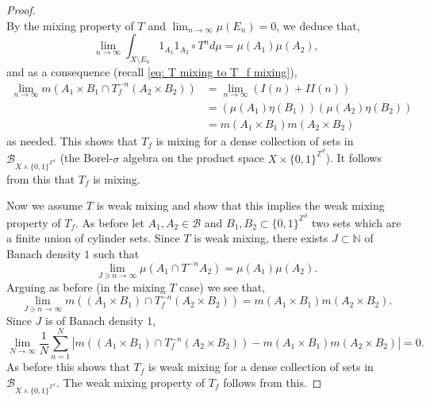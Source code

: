 \documentclass[12pt,reqno]{amsart}
\newcommand{\N}{\mathbb{N}}
\newcommand{\Z}{\mathbb{Z}}
\newcommand{\B}{\mathcal{B}}
\theoremstyle{definition}
\begin{document}
\begin{proof}
\[\]
By the mixing property of $T$ and $\lim_{n\to\infty}\mu\left(E_n\right)=0$, we deduce that,
\[
\lim_{n\to \infty}\int_{X\setminus E_n} 1_{A_1}1_{A_2}\circ T^n d\mu=\mu\left(A_1\right)\mu\left(A_2\right),
\]
and as a consequence (recall \eqref{eq: T mixing to T_f mixing}),
\begin{align*}
\lim_{n\to\infty}m\left(A_1\times B_1\cap T_f^{-n}\left(A_2\times B_2\right)\right)&=\lim_{n\to\infty}\left(I(n)+II(n)\right) \\
&=\left(\mu\left(A_1\right)\eta\left(B_1\right)\right)\left(\mu\left(A_2\right)\eta\left(B_2\right)\right)\\
&=m\left(A_1\times B_1\right) m\left(A_2\times B_2\right)
\end{align*} as needed. This shows that $T_f$ is mixing for a dense collection of sets in $\B_{X\times\{0,1\}^{\Z^d}}$ (the Borel-$\sigma$ algebra on the product space $X\times\{0,1\}^{\Z^d}$). It follows from this that $T_f$ is mixing.

Now we assume $T$ is weak mixing and show that this implies the weak mixing property of $T_f$. As before let $A_1,A_2\in\B$ and $B_1,B_2\subset\{0,1\}^{\Z^d}$ two sets which are a finite union of cylinder sets. Since $T$ is weak mixing, there exists $J\subset \N$ of Banach density $1$ such that 
\[
\lim_{J\ni n\to\infty}\mu\left(A_1\cap T^{-n}A_2\right)=\mu\left(A_1\right)\mu\left(A_2\right). 
\]
Arguing as before (in the mixing $T$ case) we see that,
\[
\lim_{J\ni n\to\infty}m\left(\left(A_1\times B_1\right)\cap T_f^{-n}\left(A_2\times B_2\right)\right)=m\left(A_1\times B_1\right) m\left(A_2\times B_2\right). 
\]
Since $J$ is of Banach density $1$, 
\[
\lim_{N\to\infty}\frac{1}{N}\sum_{n=1}^N\left|m\left(\left(A_1\times B_1\right)\cap T_f^{-n}\left(A_2\times B_2\right)\right)-m\left(A_1\times B_1\right)m\left(A_2\times B_2\right)\right|=0.
\]
As before this shows that $T_f$ is weak mixing for a dense collection of sets in $\B_{X\times\{0,1\}^{\Z^d}}$. The weak mixing property of $T_f$ follows from this.


\end{proof}


\end{document}
